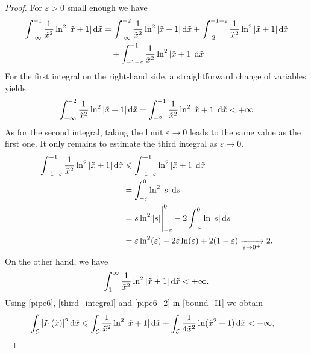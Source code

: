 \documentclass{amsart} %
\numberwithin{equation}{section}
\theoremstyle{definition}
\begin{document}
\begin{proof}
For $\varepsilon>0$ small enough we have
\begin{equation}
\begin{aligned}
    \int_{-\infty}^{-1}\frac{1}{\tilde x^2}\ln^2|\tilde x+1|\,{\rm d}\tilde x &=\int_{-\infty}^{-2}\frac{1}{\tilde x^2}\ln^2|\tilde x+1|\,{\rm d}\tilde x+\int_{-2}^{-1-\varepsilon}\frac{1}{\tilde x^2}\ln^2|\tilde x+1|\,{\rm d}\tilde x\\
    &\quad+\int_{-1-\varepsilon}^{-1}\frac{1}{\tilde x^2}\ln^2|\tilde x+1|\,{\rm d}\tilde x 
\end{aligned}
\end{equation}
For the first integral on the right-hand side, a straightforward change of variables yields 
\begin{equation}\label{pipe6}
\int_{-\infty}^{-2}\frac{1}{\tilde x^2}\ln^2|\tilde x+1|\,{\rm d}\tilde x = \int_{-2}^{-1}\frac{1}{\tilde x^2}\ln^2|\tilde x+1|\,{\rm d}\tilde x <+\infty 
\end{equation} 
As for the second integral, taking the limit $\varepsilon\to 0$ leads to the same value as the first one. It only remains to estimate the third integral as $\varepsilon\to 0$.
\begin{equation}\label{third_integral}
\begin{aligned}
    \int_{-1-\varepsilon}^{-1}\frac{1}{\tilde x^2}\ln^2|\tilde x+1|\,{\rm d}\tilde x&\leqslant\int_{-1-\varepsilon}^{-1}\ln^2|\tilde x+1|\,{\rm d}\tilde x\\
    &=\int_{-\varepsilon}^{0}\ln^2|s|\,{\rm d}s\\
    &=s\ln^2|s|\Bigg|_{-\varepsilon}^0-2\int_{-\varepsilon}^0\ln|s|\,{\rm d}s\\
    &= \varepsilon\ln^2(\varepsilon)-2\varepsilon\ln(\varepsilon)+2(1-\varepsilon)\xrightarrow[\varepsilon\to 0^+]{}2.
\end{aligned}
\end{equation}
On the other hand, we have
\begin{equation}\label{pipe6_2}
    \int_{1}^{\infty}\frac{1}{\tilde x^2}\ln^2|\tilde x+1|\,{\rm d}\tilde x<+\infty.
\end{equation}
Using \eqref{pipe6}, \eqref{third_integral} and \eqref{pipe6_2} in \eqref{bound_I1} we obtain
\begin{equation}
\begin{aligned}
 \int_{\mathcal{E}}|I_1(\tilde x)|^2\,{\rm d}\tilde x&\leqslant \int_{\mathcal{E}}\frac{1}{\tilde x^2}\ln^2|\tilde x+1|\,{\rm d}\tilde x+\int_{\mathcal{E}}\frac{1}{4\tilde x^2}\ln(\tilde x^2+1)\,{\rm d}\tilde x<+\infty,

\end{aligned}
\end{equation}
\end{proof}
\end{document}
